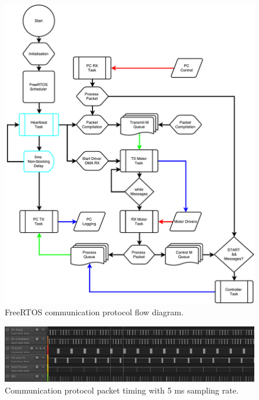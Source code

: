 \begin{figure}
\centering
\includegraphics[width=1\textwidth]{images/comms/communication-flow-diagram.pdf} 
\caption{FreeRTOS communication protocol flow diagram.}
\label{fig:FreeRTOS communication protocol flow diagram.}
\end{figure}

\begin{figure}
\centering
\includegraphics[width=1\textwidth]{images/comms/pc-packet-timing-data} 
\caption{Communication protocol packet timing with 5 ms sampling rate.}
\label{fig:packet-timing}
\end{figure}

